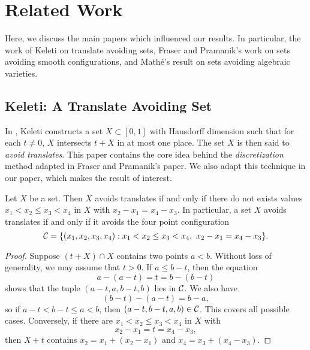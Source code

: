 
\chapter{Related Work}
\label{ch:RelatedWork}

Here, we discuss the main papers which influenced our results. In particular, the work of Keleti on translate avoiding sets, Fraser and Pramanik's work on sets avoiding smooth configurations, and Math\'{e}'s result on sets avoiding algebraic varieties. 

\begin{comment}
and Schmerkin's result on sets with large Fourier dimension avoiding smooth configurations.
\end{comment}

\section{Keleti: A Translate Avoiding Set}

In \cite{KeletiDimOneSet}, Keleti constructs a set $X \subset [0,1]$ with Hausdorff dimension such that for each $t \neq 0$, $X$ intersects $t + X$ in at most one place. The set $X$ is then said to \emph{avoid translates}. This paper contains the core idea behind the \emph{discretization} method adapted in Fraser and Pramanik's paper. We also adapt this technique in our paper, which makes the result of interest.

\begin{lemma}
    Let $X$ be a set. Then $X$ avoids translates if and only if there do not exists values $x_1 < x_2 \leq x_3 < x_4$ in $X$ with $x_2 - x_1 = x_4 - x_3$. In particular, a set $X$ avoids translates if and only if it avoids the four point configuration
    \[ \operatorname{\mathcal{C}} = \{ (x_1, x_2, x_3, x_4): x_1 < x_2 \leq x_3 < x_4,\ x_2 - x_1 = x_4 - x_3 \}. \]
\end{lemma}
\begin{proof}

    Suppose $(t + X) \cap X$ contains two points $a < b$. Without loss of generality, we may assume that $t > 0$. If $a \leq b - t$, then the equation
    \[ a - (a - t) = t = b - (b - t) \]
    shows that the tuple $(a-t,a,b-t,b)$ lies in $\operatorname{\mathcal{C}}$. We also have
    \[ (b - t) - (a - t) = b - a, \]
    so if $a - t < b - t \leq a < b$, then $(a-t,b-t,a,b) \in \operatorname{\mathcal{C}}$. This covers all possible cases. Conversely, if there are $x_1 < x_2 \leq x_3 < x_4$ in $X$ with
    \[ x_2 - x_1 = t = x_4 - x_3, \]
    then $X + t$ contains $x_2 = x_1 + (x_2 - x_1)$ and $x_4 = x_3 + (x_4 - x_3)$.
\end{proof}

